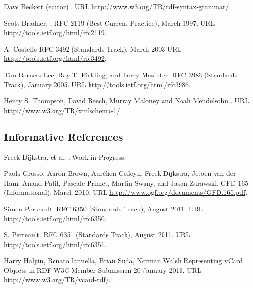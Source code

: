 \begin{thebibliography}{10}
Dave Beckett (editor)
.
\newblock URL \url{http://www.w3.org/TR/rdf-syntax-grammar/}.

Scott Bradner.
.
\newblock RFC 2119 (Best Current Practice), March 1997.
\newblock URL \url{http://tools.ietf.org/html/rfc2119}.

A. Costello
\newblock RFC 3492 (Standards Track), March 2003
\newblock URL \url{http://tools.ietf.org/html/rfc3492}.

Tim Berners-Lee, Roy T. Fielding, and Larry Masinter.
\newblock RFC 3986 (Standards Track), January 2005.
\newblock URL \url{http://tools.ietf.org/html/rfc3986}.

Henry S. Thompson, David Beech, Murray Maloney and Noah Mendelsohn
.
\newblock URL \url{http://www.w3.org/TR/xmlschema-1/}.

\end{thebibliography}

\subsection*{Informative References}

\begin{thebibliography}{10}
\vspace*{-3em}

Freek Dijkstra, et al.
.
\newblock Work in Progress.

Paola Grosso, Aaron Brown, Aur\'elien Cedeyn, Freek Dijkstra, Jeroen van der Ham, Anand Patil, Pascale Primet, Martin Swany, and Jason Zurawski.
\newblock GFD 165 (Informational), March 2010.
\newblock URL \url{http://www.ogf.org/documents/GFD.165.pdf}.

Simon Perreault.
\newblock RFC 6350 (Standards Track), August 2011.
\newblock URL \url{http://tools.ietf.org/html/rfc6350}.

S. Perreault.
\newblock RFC 6351 (Standards Track), August 2011.
\newblock URL \url{http://tools.ietf.org/html/rfc6351}.

 Harry Halpin, Renato Iannella, Brian Suda, Norman Walsh
\newblock Representing vCard Objects in RDF
\newblock W3C Member Submission 20 January 2010.
\newblock URL \url{http://www.w3.org/TR/vcard-rdf/}.


\end{thebibliography}
